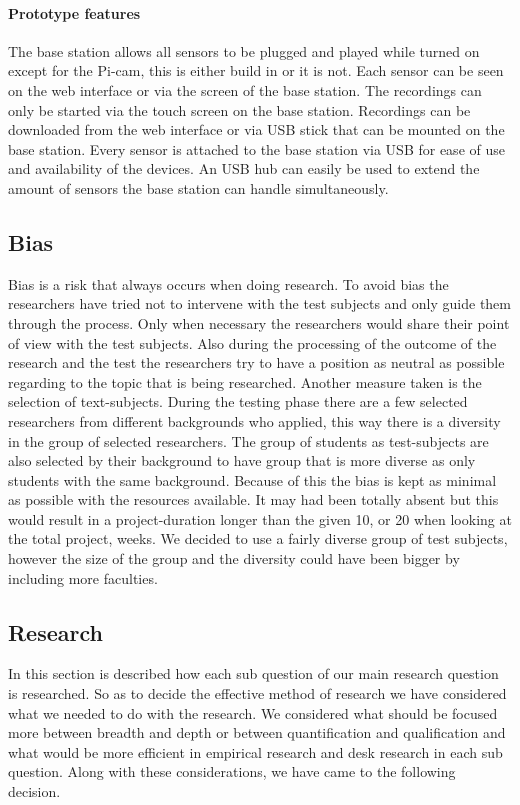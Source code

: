 \documentclass[conference]{IEEEtran}
\begin{document}
			\paragraph{Prototype features}
				The base station allows all sensors to be plugged and played while turned on except for the Pi-cam, this is either build in or it is not. Each sensor can be seen on the web interface or via the screen of the base station. The recordings can only be started via the touch screen on the base station. Recordings can be downloaded from the web interface or via USB stick that can be mounted on the base station. Every sensor is attached to the base station via USB for ease of use and availability of the devices. An USB hub can easily be used to extend the amount of sensors the base station can handle simultaneously. 
		\subsection{Bias}
			Bias is a risk that always occurs when doing research. To avoid bias the researchers have tried not to intervene with the test subjects and only guide them through the process. Only when necessary the researchers would share their point of view with the test subjects. Also during the processing of the outcome of the research and the test the researchers try to have a position as neutral as possible regarding to the topic that is being researched. Another measure taken is the selection of text-subjects. During the testing phase there are a few selected researchers from different backgrounds who applied, this way there is a diversity in the group of selected researchers. The group of students as test-subjects are also selected by their background to have group that is more diverse as only students with the same background. Because of this the bias is kept as minimal as possible with the resources available. It may had been totally absent but this would result in a project-duration longer than the given 10, or 20 when looking at the total project, weeks. We decided to use a fairly diverse group of test subjects, however the size of the group and the diversity could have been bigger by including more faculties.
		\subsection{Research}
			In this section is described how each sub question of our main research question is researched. So as to decide the effective method of research we have considered what we needed to do with the research. We considered what should be focused more between breadth and depth or between quantification and qualification and what would be more efficient in empirical research and desk research in each sub question. Along with these considerations, we have came to the following decision. 
\end{document}
